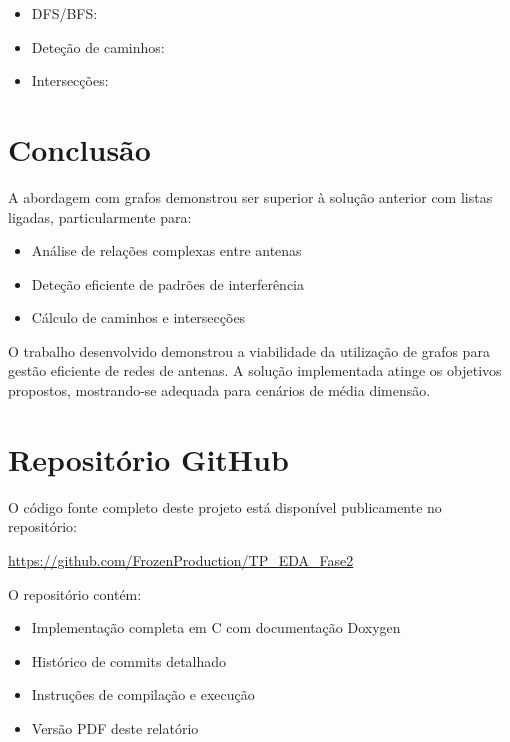 \documentclass[a4paper,12pt]{report}
\begin{document}
\begin{itemize}
    \item DFS/BFS:
    \item Deteção de caminhos:
    \item Intersecções:
\end{itemize}

\chapter{Conclusão}
A abordagem com grafos demonstrou ser superior à solução anterior com listas ligadas, particularmente para:

\begin{itemize}
    \item Análise de relações complexas entre antenas
    \item Deteção eficiente de padrões de interferência
    \item Cálculo de caminhos e intersecções
\end{itemize}

O trabalho desenvolvido demonstrou a viabilidade da utilização de grafos para gestão eficiente de redes de antenas. A solução implementada atinge os objetivos propostos, mostrando-se adequada para cenários de média dimensão. 

\chapter*{Repositório GitHub}
O código fonte completo deste projeto está disponível publicamente no repositório:

\begin{center}
\url{https://github.com/FrozenProduction/TP_EDA_Fase2}
\end{center}

O repositório contém:
\begin{itemize}
\item Implementação completa em C com documentação Doxygen
\item Histórico de commits detalhado
\item Instruções de compilação e execução
\item Versão PDF deste relatório
\end{itemize}
\end{document}
